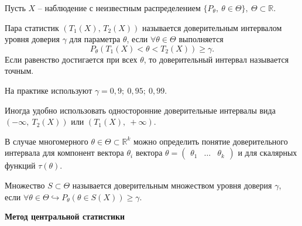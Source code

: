 Пусть $\displaystyle X$ -- наблюдение с неизвестным распределением $\displaystyle \{P_{\theta } ,\ \theta \in \Theta \} ,\ \Theta \subset \mathbb{R}$. 

\begin{definition}
    Пара статистик $\displaystyle ( T_{1}( X),\,T_{2}( X))$ называется доверительным интервалом уровня доверия $\displaystyle \gamma $ для параметра $\displaystyle \theta $, если $\displaystyle \forall \theta \in \Theta $ выполняется
\begin{equation*}
    P_\theta( T_{1}( X) < \theta < T_{2}( X)) \geqslant \gamma .
\end{equation*}
Если равенство достигается при всех $\displaystyle \theta $, то доверительный интервал называется точным.
\end{definition}
\begin{note}
    На практике используют $\displaystyle \gamma =0,9;\ 0,95;\ 0,99$.
\end{note}
Иногда удобно использовать односторонние доверительные интервалы вида $\displaystyle ( -\infty ,\ T_{2}( X))$ или $\displaystyle ( T_{1}( X) ,\ +\infty )$.

В случае многомерного $\displaystyle \theta \in \Theta \subset \mathbb{R}^{k}$ можно определить понятие доверительного интервала для компонент вектора $\displaystyle \theta _{i}$ вектора $\displaystyle \theta =\begin{pmatrix}
\theta _{1} & \dotsc  & \theta _{k}
\end{pmatrix}$ и для скалярных функций $\displaystyle \tau ( \theta )$.
\begin{definition}
    Множество $\displaystyle S\subset \Theta $ называется доверительным множеством уровня доверия $\displaystyle \gamma $, если $\displaystyle \forall \theta \in \Theta \hookrightarrow P_{\theta }( \theta \in S( X)) \geqslant \gamma $.
\end{definition}

\textbf{Метод центральной статистики}\\



